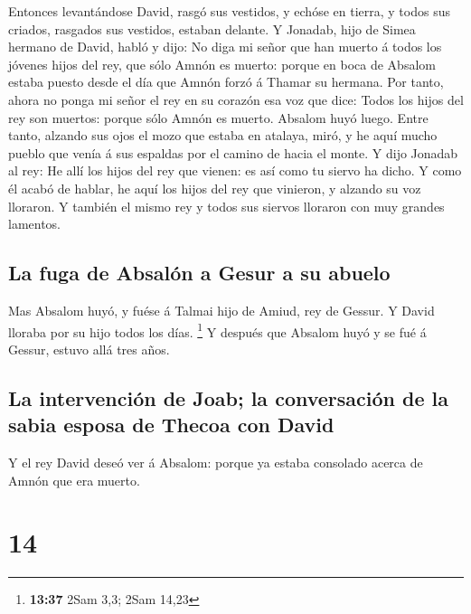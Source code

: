  Entonces levantándose David, rasgó sus vestidos, y
echóse en tierra, y todos sus criados, rasgados sus vestidos, estaban
delante.  Y Jonadab, hijo de Simea hermano de David,
habló y dijo: No diga mi señor que han muerto á todos los jóvenes hijos
del rey, que sólo Amnón es muerto: porque en boca de Absalom estaba
puesto desde el día que Amnón forzó á Thamar su hermana. 
Por tanto, ahora no ponga mi señor el rey en su corazón esa voz que
dice: Todos los hijos del rey son muertos: porque sólo Amnón es muerto.
 Absalom huyó luego. Entre tanto, alzando sus ojos el
mozo que estaba en atalaya, miró, y he aquí mucho pueblo que venía á sus
espaldas por el camino de hacia el monte.  Y dijo Jonadab
al rey: He allí los hijos del rey que vienen: es así como tu siervo ha
dicho.  Y como él acabó de hablar, he aquí los hijos del
rey que vinieron, y alzando su voz lloraron. Y también el mismo rey y
todos sus siervos lloraron con muy grandes lamentos.

\hypertarget{la-fuga-de-absaluxf3n-a-gesur-a-su-abuelo}{%
\subsection{La fuga de Absalón a Gesur a su
abuelo}\label{la-fuga-de-absaluxf3n-a-gesur-a-su-abuelo}}

 Mas Absalom huyó, y fuése á Talmai hijo de Amiud, rey de
Gessur. Y David lloraba por su hijo todos los días. \footnote{\textbf{13:37}
  2Sam 3,3; 2Sam 14,23}  Y después que Absalom huyó y se
fué á Gessur, estuvo allá tres años.

\hypertarget{la-intervenciuxf3n-de-joab-la-conversaciuxf3n-de-la-sabia-esposa-de-thecoa-con-david}{%
\subsection{La intervención de Joab; la conversación de la sabia esposa
de Thecoa con
David}\label{la-intervenciuxf3n-de-joab-la-conversaciuxf3n-de-la-sabia-esposa-de-thecoa-con-david}}

 Y el rey David deseó ver á Absalom: porque ya estaba
consolado acerca de Amnón que era muerto.

\hypertarget{section-13}{%
\section{14}\label{section-13}}

